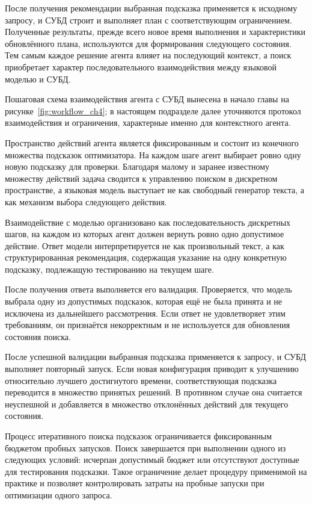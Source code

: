 После получения рекомендации выбранная подсказка применяется к исходному запросу, и СУБД строит и выполняет план с соответствующим ограничением. Полученные результаты, прежде всего новое время выполнения и характеристики обновлённого плана, используются для формирования следующего состояния. Тем самым каждое решение агента влияет на последующий контекст, а поиск приобретает характер последовательного взаимодействия между языковой моделью и СУБД.


Пошаговая схема взаимодействия агента с СУБД вынесена в начало главы на рисунке~\ref{fig:workflow_ch4}; в настоящем подразделе далее уточняются протокол взаимодействия и ограничения, характерные именно для контекстного агента.

Пространство действий агента является фиксированным и состоит из конечного множества подсказок оптимизатора. На каждом шаге агент выбирает ровно одну новую подсказку для проверки. Благодаря малому и заранее известному множеству действий задача сводится к управлению поиском в дискретном пространстве, а языковая модель выступает не как свободный генератор текста, а как механизм выбора следующего действия.

Взаимодействие с моделью организовано как последовательность дискретных шагов, на каждом из которых агент должен вернуть ровно одно допустимое действие. Ответ модели интерпретируется не как произвольный текст, а как структурированная рекомендация, содержащая указание на одну конкретную подсказку, подлежащую тестированию на текущем шаге.

После получения ответа выполняется его валидация. Проверяется, что модель выбрала одну из допустимых подсказок, которая ещё не была принята и не исключена из дальнейшего рассмотрения. Если ответ не удовлетворяет этим требованиям, он признаётся некорректным и не используется для обновления состояния поиска.

После успешной валидации выбранная подсказка применяется к запросу, и СУБД выполняет повторный запуск. Если новая конфигурация приводит к улучшению относительно лучшего достигнутого времени, соответствующая подсказка переводится в множество принятых решений. В противном случае она считается неуспешной и добавляется в множество отклонённых действий для текущего состояния.

Процесс итеративного поиска подсказок ограничивается фиксированным бюджетом пробных запусков. Поиск завершается при выполнении одного из следующих условий: исчерпан допустимый бюджет или отсутствуют доступные для тестирования подсказки. Такое ограничение делает процедуру применимой на практике и позволяет контролировать затраты на пробные запуски при оптимизации одного запроса.

